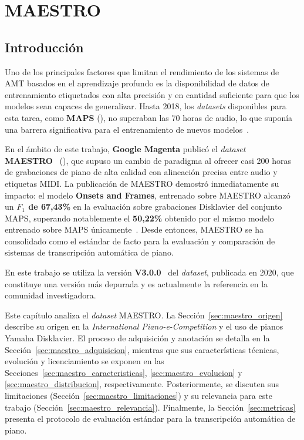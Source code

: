 \documentclass[11pt,spanish,listoffigures,listoftables]{tfgetsinf}
\begin{document}

\chapter{MAESTRO}
\label{chap:maestro}

\section{Introducción}
Uno de los principales factores que limitan el rendimiento de los sistemas de AMT basados en el aprendizaje
profundo es la disponibilidad de datos de entrenamiento etiquetados con alta precisión y en cantidad suficiente
para que los modelos sean capaces de generalizar. Hasta 2018, los \textit{datasets} disponibles para esta tarea, como \textbf{MAPS}
(), no superaban las 70 horas de audio, 
lo que suponía una barrera significativa para el entrenamiento de nuevos modelos~\cite{emiya2010maps}.

En el ámbito de este trabajo, \textbf{Google Magenta} publicó el \textit{dataset} \textbf{MAESTRO}~\cite{hawthorne2019maestro} (),
que supuso un cambio de paradigma al ofrecer casi 200 horas de grabaciones de piano de alta calidad con alineación precisa entre audio y etiquetas MIDI.
La publicación de MAESTRO demostró inmediatamente su impacto: el modelo \textbf{Onsets and Frames}, entrenado sobre MAESTRO alcanzó un \textbf{$F_1$ de 67,43\%}
en la evaluación sobre grabaciones Disklavier del conjunto MAPS, superando notablemente el \textbf{50,22\%} obtenido por el mismo modelo 
entrenado sobre MAPS únicamente~\cite{hawthorne2018onsetsframes,hawthorne2019maestro}. Desde entonces, MAESTRO se ha consolidado como el estándar de facto para la evaluación y comparación de sistemas de transcripción automática de piano.

En este trabajo se utiliza la versión \textbf{V3.0.0}~\cite{magenta2020maestrov3} del \textit{dataset}, publicada en 2020, que constituye una versión más depurada y es actualmente la referencia en la comunidad investigadora.

Este capítulo analiza el \textit{dataset} MAESTRO. La
Sección~\ref{sec:maestro_origen} describe su origen en la
\textit{International Piano-e-Competition} y el uso de pianos
Yamaha Disklavier. El proceso de adquisición y anotación se
detalla en la Sección~\ref{sec:maestro_adquisicion}, mientras
que sus características técnicas, evolución y licenciamiento
se exponen en las Secciones~\ref{sec:maestro_caracteristicas},
\ref{sec:maestro_evolucion} y \ref{sec:maestro_distribucion}, respectivamente.
Posteriormente, se discuten sus limitaciones %
(Sección~\ref{sec:maestro_limitaciones}) y su relevancia para
este trabajo (Sección~\ref{sec:maestro_relevancia}). %
Finalmente, la Sección~\ref{sec:metricas} presenta el protocolo
de evaluación estándar para la transcripción automática de piano.
\end{document}
